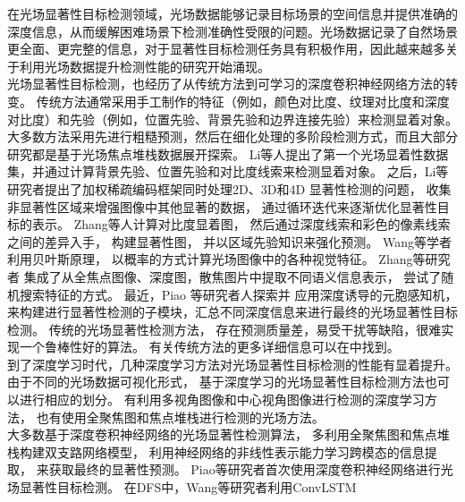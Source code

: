 \label{chpt1:title:lf_methods}
在光场显著性目标检测领域，光场数据能够记录目标场景的空间信息并提供准确的深度信息，从而缓解困难场景下检测准确性受限的问题。光场数据记录了自然场景更全面、更完整的信息，对于显著性目标检测任务具有积极作用，因此越来越多关于利用光场数据提升检测性能的研究开始涌现。
\\
%
%
%
%
\indent
光场显著性目标检测，也经历了从传统方法到可学习的深度卷积神经网络方法的转变。
传统方法通常采用手工制作的特征（例如，颜色对比度、纹理对比度和深度对比度）和先验（例如，位置先验、背景先验和边界连接先验）来检测显着对象。 
大多数方法采用先进行粗糙预测，然后在细化处理的多阶段检测方式，而且大部分研究都是基于光场焦点堆栈数据展开探索。
%
%
Li等人提出了第一个光场显着性数据集，并通过计算背景先验、位置先验和对比度线索来检测显着对象。
之后，Li等研究者提出了加权稀疏编码框架同时处理2D、3D和4D 显著性检测的问题，
收集非显著性区域来增强图像中其他显著的数据，
通过循环迭代来逐渐优化显著性目标的表示。
Zhang等人计算对比度显着图，
然后通过深度线索和彩色的像素线索之间的差异入手，
构建显著性图，
并以区域先验知识来强化预测。
Wang等学者利用贝叶斯原理，
以概率的方式计算光场图像中的各种视觉特征。
Zhang等研究者
集成了从全焦点图像、深度图，散焦图片中提取不同语义信息表示，
尝试了随机搜索特征的方式。
最近，Piao 等研究者人探索并
应用深度诱导的元胞感知机，
来构建进行显著性检测的子模块，汇总不同深度信息来进行最终的光场显著性目标检测。
传统的光场显著性检测方法，
存在预测质量差，易受干扰等缺陷，很难实现一个鲁棒性好的算法。
有关传统方法的更多详细信息可以在中找到。
\\
%
%
%
%
\indent
到了深度学习时代，几种深度学习方法对光场显著性目标检测的性能有显着提升。
由于不同的光场数据可视化形式，
基于深度学习的光场显著性目标检测方法也可以进行相应的划分。
有利用多视角图像和中心视角图像进行检测的深度学习方法，
也有使用全聚焦图和焦点堆栈进行检测的光场方法。
\\
%
%
%
%
\indent
大多数基于深度卷积神经网络的光场显著性检测算法，
多利用全聚焦图和焦点堆栈构建双支路网络模型，
利用神经网络的非线性表示能力学习跨模态的信息提取，
来获取最终的显著性预测。
Piao等研究者首次使用深度卷积神经网络进行光场显著性目标检测。
在DFS中，Wang等研究者利用ConvLSTM
